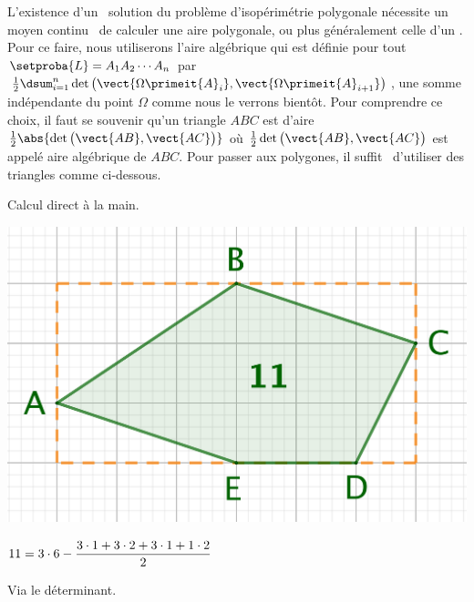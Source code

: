 L'existence d'un \ngone\ solution du problème d'isopérimétrie polygonale nécessite un moyen \og continu \fg\ de calculer une aire polygonale, ou plus généralement celle d'un \ncycle.
Pour ce faire, nous utiliserons l'aire algébrique qui est définie pour tout \ncycle\ $\setproba{L} = A_1 A_2 \cdots A_n$ par $\frac12 \dsum_{i=1}^{n} \det \big( \vect{\Omega \primeit{A}_i} , \vect{\Omega \primeit{A}_{i+1}} \big)$, une somme indépendante du point $\Omega$ comme nous le verrons bientôt.
Pour comprendre ce choix,
il faut se souvenir qu'un triangle $ABC$ est d'aire $\frac12 \abs{ \det \big( \vect{AB} , \vect{AC} \big) }$ où $\frac12 \det \big( \vect{AB} , \vect{AC} \big)$ est appelé aire algébrique de $ABC$. Pour passer aux polygones, il \og suffit \fg\ d'utiliser des triangles comme ci-dessous.


\begin{multicols}{2}
    \small\itshape
    \begin{center}
        Calcul direct à la main.

        \smallskip

        \includegraphics[scale=.35]{convex-1.png}

           \smallskip

        $11 = 3 \cdot 6 - \dfrac{3 \cdot 1 + 3 \cdot 2 + 3 \cdot 1 + 1 \cdot 2}{2} \vphantom{\dfrac{2^M}2}$
    \end{center}

    \columnbreak

    \begin{center}
        Via le déterminant.

        \smallskip


\end{center}
\end{multicols}

